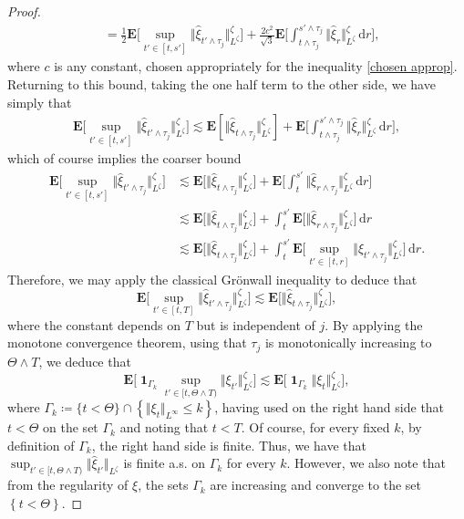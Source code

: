 \documentclass[11pt, a4paper,oneside, reqno]{amsart}
\theoremstyle{remark} %
\theoremstyle{definition} %
\numberwithin{theorem}{section}
\numberwithin{equation}{section}
\newcommand{\norm}[1]{\Vert #1 \Vert}
\renewcommand{\hat}[1]{\widehat{#1}}
\newcommand{\dd}{\hspace{2pt}\mathrm{d}}
\DeclareMathOperator{\ind}{\mathbf{1}}
\begin{document}
\begin{proof}
\begin{align*}
         &= \frac{1}{2}\mathbf{E}\Big[\sup_{t'\in[t,s']}\norm{\hat{\xi}_{t'\wedge\tau_j}}_{L^{\zeta}}^{\zeta}\Big] + \frac{2c^2}{\sqrt{3}}\mathbf{E}\Big[\int_{t \wedge \tau_j}^{s'\wedge\tau_j}\norm{\hat{\xi}_r}_{L^{\zeta}}^{\zeta}\dd r\Big],
\end{align*}
where $c$ is any constant, chosen appropriately for the inequality \eqref{chosen approp}. Returning to this bound, taking the one half term to the other side, we have simply that
    \begin{align}
 \nonumber   \mathbf{E}\Big[\sup_{t' \in [t,s']} \norm{\hat{\xi}_{t' \wedge \tau_j}}_{L^{\zeta}}^{\zeta}\Big]  \lesssim \mathbf{E}\left[\norm{\hat{\xi}_{t \wedge \tau_j}}_{L^{\zeta}}^{\zeta}\right] +  \mathbf{E}\Big[\int_{t \wedge \tau_j}^{s'\wedge\tau_j}\norm{\hat{\xi}_r}_{L^{\zeta}}^{\zeta}\dd r\Big],
\end{align}
which of course implies the coarser bound
    \begin{align*}
   \mathbf{E}\Big[\sup_{t' \in [t,s']} \norm{\hat{\xi}_{t' \wedge \tau_j}}_{L^{\zeta}}^{\zeta}\Big]  
 &\lesssim \mathbf{E}\Big[\norm{\hat{\xi}_{t \wedge \tau_j}}_{L^{\zeta}}^{\zeta}\Big] +  \mathbf{E}\Big[\int_{t}^{s'}\norm{\hat{\xi}_{r \wedge \tau_j}}_{L^{\zeta}}^{\zeta}\dd r\Big]\\
&\lesssim \mathbf{E}\Big[\norm{\hat{\xi}_{t \wedge \tau_j}}_{L^{\zeta}}^{\zeta}\Big] +  \int_{t}^{s'}\mathbf{E}\Big[\norm{\hat{\xi}_{r \wedge \tau_j}}_{L^{\zeta}}^{\zeta}\Big]\dd r
\\
&\lesssim \mathbf{E}\Big[\norm{\hat{\xi}_{t \wedge \tau_j}}_{L^{\zeta}}^{\zeta}\Big] +  \int_{t}^{s'}\mathbf{E}\Big[\sup_{t' \in [t,r]}\norm{\hat{\xi}_{t' \wedge \tau_j}}_{L^{\zeta}}^{\zeta}\Big]\dd r.
\end{align*}
Therefore, we may apply the classical Gr\"{o}nwall inequality to deduce that
$$\mathbf{E}\Big[\sup_{t' \in [t,T]} \norm{\hat{\xi}_{t' \wedge \tau_j}}_{L^{\zeta}}^{\zeta}\Big]  
 \lesssim \mathbf{E}\Big[\norm{\hat{\xi}_{t \wedge \tau_j}}_{L^{\zeta}}^{\zeta}\Big],$$
where the constant depends on $T$ but is independent of $j$. By applying the monotone convergence theorem, using that $\tau_j$ is monotonically increasing to $\Theta \wedge T$, we deduce that
$$\mathbf{E}\Big[\ind_{\Gamma_k}\sup_{t' \in [t,\Theta \wedge T)} \norm{\xi_{t'}}_{L^{\zeta}}^{\zeta}\Big]  
 \lesssim \mathbf{E}\Big[\ind_{\Gamma_k}\norm{\xi_{t}}_{L^{\zeta}}^{\zeta}\Big],$$
 where $\Gamma_k \coloneqq \{t < \Theta\} \cap \left\{\norm{\xi_t}_{L^\infty} \leq k\right\}$, having used on the right hand side that $t < \Theta$ on the set $\Gamma_k$ and noting that $t < T$. Of course, for every fixed $k$, by definition of $\Gamma_k$, the right hand side is finite. Thus, we have that $\sup_{t' \in [t,\Theta \wedge T)} \norm{\hat{\xi}_{t'}}_{L^{\zeta}} $ is finite a.s. on $\Gamma_k$ for every $k$. However, we also note that from the regularity of $\xi$, the sets $\Gamma_k$ are increasing and converge to the set $\left\{t < \Theta\right\}$. 

\end{proof}
\end{document}
